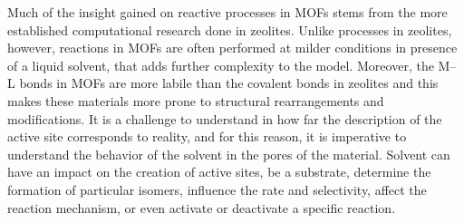\npar
Much of the insight gained on reactive processes in MOFs stems from the more established computational research done in zeolites. Unlike processes in zeolites, however, reactions in MOFs are often performed at milder conditions in presence of a liquid solvent, that adds further complexity to the model. Moreover, the M--L bonds in MOFs are more labile than the covalent bonds in zeolites and this makes these materials more prone to structural rearrangements and modifications. It is a challenge to understand in how far the description of the active site corresponds to reality, and for this reason, it is imperative to understand the behavior of the solvent in the pores of the material. Solvent can have an impact on the creation of active sites, be a substrate, determine the formation of particular isomers, influence the rate and selectivity, affect the reaction mechanism, or even activate or deactivate a specific reaction.
\npar

